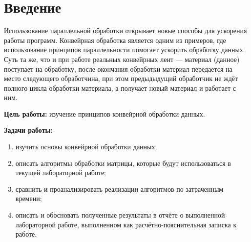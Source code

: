 \chapter*{Введение}

Использование параллельной обработки открывает новые способы для
ускорения работы программ.
Конвейрная обработка является одним из примеров, где использование принципов параллельности помогает ускорить обработку данных. 
Суть та же, что и при работе реальных конвейрных лент --- материал (данное) поступает на обработку, после окончания обработки материал передается на место следующего обработчина, при этом предыдыдущий обработчик не ждёт полного цикла обработки материала, а получает новый материал и работает с ним.


\textbf{Цель работы:} изучение принципов конвейрной обработки данных.

\textbf{Задачи работы:}
\begin{enumerate}[label=\arabic*)]
	\item изучить основы конвейрной обработки данных;
    \item описать алгоритмы обработки матрицы, которые будут использоваться
    в текущей лабораторной работе;
    \item сравнить и проанализировать реализации алгоритмов по затраченным  времени;
	\item описать и обосновать полученные результаты в отчёте о выполненной лабораторной работе, выполненном как расчётно-пояснительная записка к работе.
\end{enumerate}